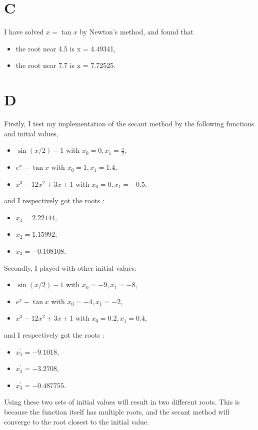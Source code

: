 \documentclass[a4paper]{article}
\begin{document}
\section{C}
I have solved $x = \tan x$ by Newton's method, and found that
\begin{itemize}
  \item the root near 4.5 is x = 4.49341,
  \item the root near 7.7 is x = 7.72525.
\end{itemize}

\section{D}
Firstly, I test my implementation of the secant method by the following functions and initial values,
\begin{itemize}
  \item \(\sin(x/2) - 1\) with \(x_0 = 0, x_1 = \frac{\pi}{2}\),
  \item \(e^x - \tan x\) with \(x_0 = 1, x_1 = 1.4\),
  \item \(x^3 - 12x^2 + 3x + 1\) with \(x_0 = 0, x_1 = -0.5\).
\end{itemize}
and I respectively got the roots :
\begin{itemize}
  \item $x_1 = 2.22144$,
  \item $x_2 = 1.15992$,
  \item $x_3 = -0.108108$.
\end{itemize}

Secondly, I played with other initial values:
\begin{itemize}
  \item \(\sin(x/2) - 1\) with \(x_0 = -9, x_1 = -8\),
  \item \(e^x - \tan x\) with \(x_0 = -4, x_1 = -2\),
  \item \(x^3 - 12x^2 + 3x + 1\) with \(x_0 = 0.2, x_1 = 0.4\),
\end{itemize}
and I respectively got the roots :
\begin{itemize}
  \item $x_{1}^{'} = -9.1018$,
  \item $x_{2}^{'} = -3.2708$,
  \item $x_{3}^{'} = -0.487755$.
\end{itemize}

Using these two sets of initial values will result in two different roots. This is because the function itself has multiple roots, and the secant method will converge to the root closest to the initial value.
\end{document}
